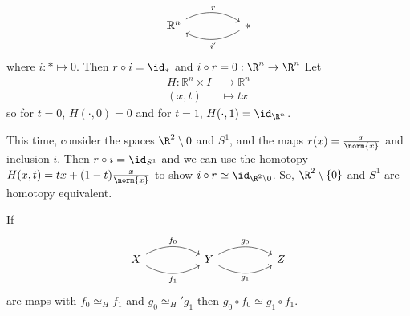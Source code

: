 \documentclass{article}
\numberwithin{nthm}{subsection}
\begin{document}

\begin{eg}
    \begin{equation*}
        \begin{tikzcd}[column sep=huge]
            \mathbb{R}^n \rar[bend left,"r"] & * \lar[bend left,"i'"]
        \end{tikzcd}
    \end{equation*}
    where $i: * \mapsto 0$. Then $r \circ i = \id_*$ and $i \circ r = 0: \R^n \to \R^n$
    Let
    \begin{align*}
        H:\mathbb{R}^n \times I &\longrightarrow \mathbb{R}^n \\
        (x,t) &\longmapsto t x
    \end{align*}
    so for $t=0$, $H(\cdot, 0) = 0$ and for $t=1$, $H(\cdot, 1) = \id_{\R^n}$.
\end{eg}

\begin{eg}
    This time, consider the spaces $\R^2 \setminus {0}$ and $S^1$, and the maps $r(x) = \frac{x}{\norm{x}}$  and inclusion $i$.  Then $r \circ i = \id_{S^1}$ and we can use the homotopy $H(x, t) = tx + (1-t) \frac{x}{\norm{x}}$ to show $i \circ r \simeq \id_{\R^2 \setminus {0}}$.  So, $\R^2 \setminus \{0\}$ and $S^1$ are homotopy equivalent.
\end{eg}


\begin{lemma}
    If
    \begin{equation*}
        \begin{tikzcd}[column sep=huge]
            X \rar[bend left,"f_0"] \rar[bend right,"f_1"'] & Y \rar[bend left,"g_0"] \rar[bend right,"g_1"'] & Z
        \end{tikzcd}
    \end{equation*}
    are maps with $f_0 \simeq_H f_1$ and $g_0 \simeq_H' g_1$ then $g_0 \circ f_0 \simeq g_1 \circ f_1$.
\end{lemma}
\end{document}
